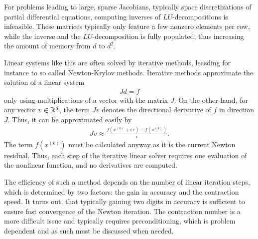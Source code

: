 \begin{remark}
  For problems leading to large, sparse Jacobians, typically space
  discretizations of partial differential equations, computing
  inverses of $LU$-decompositions is infeasible. These matrices
  typically only feature a few nonzero elements per row, while the
  inverse and the $LU$-decomposition is fully populated, thus
  increasing the amount of memory from $d$ to $d^2$.

  Linear systems like this are often solved by iterative methods,
  leasding for instance to so called Newton-Krylov methods. Iterative
  methods approximate the solution of a linear system
  \begin{gather*}
    J d = f
  \end{gather*}
  only using multiplications of a vector with the matrix $J$. On
  the other hand, for any vector $v\in \mathbb R^d$, the term $Jv$ denotes
  the directional derivative of $f$ in direction $J$. Thus, it can be
  approximated easily by
  \begin{gather*}
    J v \approx \frac{f\left(x^{(k)}+\epsilon v\right) -
      f\left(x^{(k)}\right)}{\epsilon}.
  \end{gather*}
  The term $f\left(x^{(k)}\right)$ must be calculated anyway as it is
  the current Newton residual. Thus, each step of the iterative linear
  solver requires one evaluation of the nonlinear function, and no
  derivatives are computed.

  The efficiency of such a method depends on the number of linear
  iteration steps, which is determined by two factors: the gain in
  accuracy and the contraction speed. It turns out, that typically
  gaining two digits in accuracy is sufficient to ensure fast
  convergence of the Newton iteration. The contraction number is a
  more difficult issue and typically requires preconditioning, which
  is problem dependent and as such must be discussed when needed.
\end{remark}

